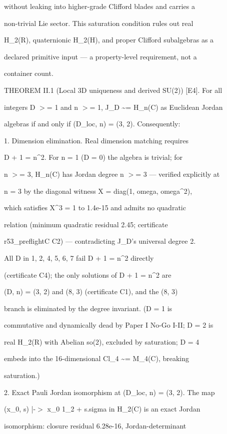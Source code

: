 \documentclass[11pt,a4paper]{article}
\theoremstyle{definition}
\begin{document}
without leaking into higher-grade Clifford blades and carries a

non-trivial Lie sector. This saturation condition rules out real

H\_2(R), quaternionic H\_2(H), and proper Clifford subalgebras as a

declared primitive input — a property-level requirement, not a

container count.


THEOREM II.1 (Local 3D uniqueness and derived SU(2)) [E4]. For all

integers D $>$= 1 and n $>$= 1, J\_D \textasciitilde{}= H\_n(C) as Euclidean Jordan

algebras if and only if (D\_loc, n) = (3, 2). Consequently:


1. Dimension elimination. Real dimension matching requires

   D + 1 = n\^{}2. For n = 1 (D = 0) the algebra is trivial; for

   n $>$= 3, H\_n(C) has Jordan degree n $>$= 3 — verified explicitly at

   n = 3 by the diagonal witness X = diag(1, omega, omega\^{}2),

   which satisfies X\^{}3 = 1 to 1.4e-15 and admits no quadratic

   relation (minimum quadratic residual 2.45; certificate

   r53\_preflightC C2) — contradicting J\_D's universal degree 2.

   All D in {1, 2, 4, 5, 6, 7} fail D + 1 = n\^{}2 directly

   (certificate C4); the only solutions of D + 1 = n\^{}2 are

   (D, n) = (3, 2) and (8, 3) (certificate C1), and the (8, 3)

   branch is eliminated by the degree invariant. (D = 1 is

   commutative and dynamically dead by Paper I No-Go I-II; D = 2 is

   real H\_2(R) with Abelian so(2), excluded by saturation; D = 4

   embeds into the 16-dimensional Cl\_4 \textasciitilde{}= M\_4(C), breaking

   saturation.)

2. Exact Pauli Jordan isomorphism at (D\_loc, n) = (3, 2). The map

   (x\_0, s) |-$>$ x\_0 1\_2 + s.sigma in H\_2(C) is an exact Jordan

   isomorphism: closure residual 6.28e-16, Jordan-determinant
\end{document}

